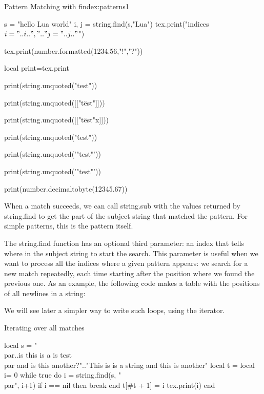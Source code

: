 \begin{texexample}{Pattern Matching with find}{ex:patterns1}
\begin{luacode*}
s = "hello Lua world"
i, j = string.find(s,"Lua")
tex.print("indices $i="..i..",".."j="..j.."$")

tex.print(number.formatted(1234.56,"!","?"))

local print=tex.print

print(string.unquoted("test"))

print(string.unquoted([["t\"est"]]))

print(string.unquoted([["t\"est"x]]))

print(string.unquoted("\'test\'"))

print(string.unquoted('"test"'))

print(string.unquoted('"test"'))


print(number.decimaltobyte(12345.67))
\end{luacode*}
\end{texexample}

When a match succeeds, we can call string.sub with the values returned by
string.find to get the part of the subject string that matched the pattern. For
simple patterns, this is the pattern itself.

The string.find function has an optional third parameter: an index that
tells where in the subject string to start the search. This parameter is useful
when we want to process all the indices where a given pattern appears: we
search for a new match repeatedly, each time starting after the position where
we found the previous one. As an example, the following code makes a table
with the positions of all newlines in a string:

We will see later a simpler way to write such loops, using the 
iterator.

\begin{texexample}{Iterating over all matches}{}
\edef\tempstring{\string\\par..is this is a is test \string\\par and is this another?}
\begin{luacode}
local s = "\tempstring".."This is is a string and this is another"
local t = {}
local i= 0
while true do
    i = string.find(s, "\\par", i+1)
    if i == nil then break end
    t[#t + 1] = i
    tex.print(i)
end
   
\end{luacode}
\end{texexample}


